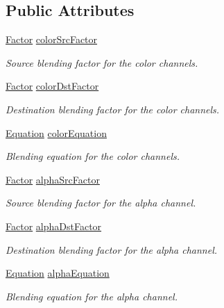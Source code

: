 \subsection*{Public Attributes}
\begin{DoxyCompactItemize}
\item 
\hyperlink{structsf_1_1_blend_mode_afb9852caf356b53bb0de460c58a9ebbb}{Factor} \hyperlink{structsf_1_1_blend_mode_a32d1a55dbfada86a06d9b881dc8ccf7b}{color\-Src\-Factor}
\begin{DoxyCompactList}\small\item\em Source blending factor for the color channels. \end{DoxyCompactList}\item 
\hyperlink{structsf_1_1_blend_mode_afb9852caf356b53bb0de460c58a9ebbb}{Factor} \hyperlink{structsf_1_1_blend_mode_adee68ee59e7f1bf71d12db03d251104d}{color\-Dst\-Factor}
\begin{DoxyCompactList}\small\item\em Destination blending factor for the color channels. \end{DoxyCompactList}\item 
\hyperlink{structsf_1_1_blend_mode_a7bce470e2e384c4f9c8d9595faef7c32}{Equation} \hyperlink{structsf_1_1_blend_mode_aed12f06eb7f50a1b95b892b0964857b1}{color\-Equation}
\begin{DoxyCompactList}\small\item\em Blending equation for the color channels. \end{DoxyCompactList}\item 
\hyperlink{structsf_1_1_blend_mode_afb9852caf356b53bb0de460c58a9ebbb}{Factor} \hyperlink{structsf_1_1_blend_mode_aa94e44f8e1042a7357e8eff78c61a1be}{alpha\-Src\-Factor}
\begin{DoxyCompactList}\small\item\em Source blending factor for the alpha channel. \end{DoxyCompactList}\item 
\hyperlink{structsf_1_1_blend_mode_afb9852caf356b53bb0de460c58a9ebbb}{Factor} \hyperlink{structsf_1_1_blend_mode_aaf85b6b7943181cc81745569c4851e4e}{alpha\-Dst\-Factor}
\begin{DoxyCompactList}\small\item\em Destination blending factor for the alpha channel. \end{DoxyCompactList}\item 
\hyperlink{structsf_1_1_blend_mode_a7bce470e2e384c4f9c8d9595faef7c32}{Equation} \hyperlink{structsf_1_1_blend_mode_a68f5a305e0912946f39ba6c9265710c4}{alpha\-Equation}
\begin{DoxyCompactList}\small\item\em Blending equation for the alpha channel. \end{DoxyCompactList}\end{DoxyCompactItemize}
